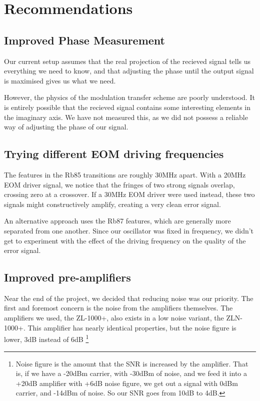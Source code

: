 \newpage
\section{Recommendations}

\subsection{Improved Phase Measurement}

Our current setup assumes that the real projection of the recieved signal tells us everything we need to know, and that adjusting the phase until the output signal is maximised gives us what we need.

However, the physics of the modulation transfer scheme are poorly understood.  It is entirely possible that the recieved signal contains some interesting elements in the imaginary axis.  We have not measured this, as we did not possess a reliable way of adjusting the phase of our signal.

\subsection{Trying different EOM driving frequencies}

The features in the Rb85 transitions are roughly 30MHz apart.  With a 20MHz EOM driver signal, we notice that the fringes of two strong signals overlap, crossing zero at a crossover.  If a 30MHz EOM driver were used instead, these two signals might constructively amplify, creating a very clean error signal.

An alternative approach uses the Rb87 features, which are generally more separated from one another.  Since our oscillator was fixed in frequency, we didn't get to experiment with the effect of the driving frequency on the quality of the error signal.

\subsection{Improved pre-amplifiers}

Near the end of the project, we decided that reducing noise was our priority.  The first and foremost concern is the noise from the amplifiers themselves.  The amplifiers we used, the ZL-1000+, also exists in a low noise variant, the ZLN-1000+.  This amplifier has nearly identical properties, but the noise figure is lower, 3dB instead of 6dB \footnote{Noise figure is the amount that the SNR is increased by the amplifier.  That is, if we have a -20dBm carrier, with -30dBm of noise, and we feed it into a +20dB amplifier with +6dB noise figure, we get out a signal with 0dBm carrier, and -14dBm of noise.  So our SNR goes from 10dB to 4dB.}

